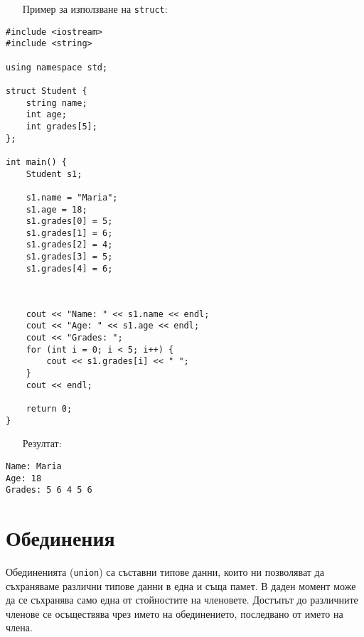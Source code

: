 \documentclass[oneside]{book}
\newcommand*{\code}[1]{\texttt{#1}}
\begin{document}
\begin{itemize}\item[Пример] за използване на \code{struct}:\end{itemize}\vspace{-12pt}
\begin{mdframed}\begin{lstlisting} 
#include <iostream>
#include <string>

using namespace std;

struct Student {
    string name;
    int age;
    int grades[5];
};

int main() {
    Student s1;

    s1.name = "Maria";
    s1.age = 18;
    s1.grades[0] = 5;
    s1.grades[1] = 6;
    s1.grades[2] = 4;
    s1.grades[3] = 5;
    s1.grades[4] = 6;
    
\end{lstlisting}\end{mdframed}
\begin{mdframed}\begin{lstlisting}[firstnumber=last]

    cout << "Name: " << s1.name << endl;
    cout << "Age: " << s1.age << endl;
    cout << "Grades: ";
    for (int i = 0; i < 5; i++) {
        cout << s1.grades[i] << " ";
    }
    cout << endl;

    return 0;
}
\end{lstlisting}\end{mdframed}

\begin{itemize}\item[Резултат:]\end{itemize}\vspace{-10pt}
\begin{mdframed}\begin{lstlisting}[language={}]
Name: Maria
Age: 18
Grades: 5 6 4 5 6 
\end{lstlisting}\end{mdframed}

\section{Обединения}
Обединенията (\code{union}) са съставни типове данни, които ни позволяват да съхраняваме различни типове данни в една и съща памет.
В даден момент може да се съхранява само една от стойностите на членовете.
Достъпът до различните членове се осъществява чрез името на обединението, последвано от името на члена.
\end{document}
